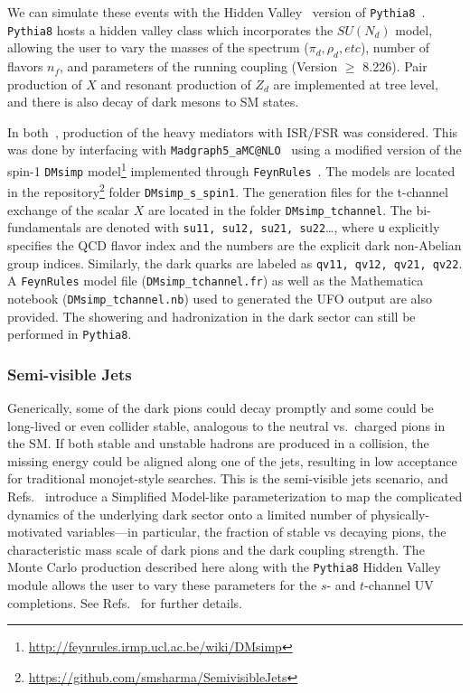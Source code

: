 
We can simulate these events with the Hidden Valley~\cite{Carloni:2010tw} version of \verb!Pythia8!~\cite{Sjostrand:2014zea}. \verb!Pythia8! hosts a hidden valley class which incorporates the $SU(N_{d})$ model, allowing the user to vary the masses of the spectrum ($\pi_{d}, \rho_{d}, etc$), number of flavors $n_{f}$, and parameters of the running coupling (Version $\geq$ 8.226). Pair production of $X$ and resonant production of $Z_d$ are implemented at tree level, and there is also decay of dark mesons to SM states.

In both~\cite{Cohen:2017pzm,Linthorne:2018abc}, production of the heavy mediators with ISR/FSR was considered. This was done by interfacing with \verb!Madgraph5_aMC@NLO!~\cite{Alwall:2014hca} using a modified version of the spin-1 \texttt{DMsimp} model\footnote{\url{http://feynrules.irmp.ucl.ac.be/wiki/DMsimp}} implemented through \texttt{FeynRules}~\cite{Alloul:2013bka}.
The models are located in the repository\footnote{\url{https://github.com/smsharma/SemivisibleJets}} folder \texttt{DMsimp\_s\_spin1}.  The generation files for the t-channel exchange of the scalar $X$  are located in the folder \texttt{DMsimp\_tchannel}. The bi-fundamentals are denoted with \texttt{su11, su12, su21, su22}\ldots, where \texttt{u} explicitly specifies the QCD flavor index and the numbers are the explicit dark non-Abelian group indices. Similarly, the dark quarks are labeled as \texttt{qv11, qv12, qv21, qv22}. A \texttt{FeynRules} model file (\texttt{DMsimp\_tchannel.fr}) as well as the Mathematica notebook (\texttt{DMsimp\_tchannel.nb}) used to generated the UFO output are also provided. The showering and hadronization in the dark sector can still be performed in \verb!Pythia8!. 


\subsubsection{Semi-visible Jets}

Generically, some of the dark pions could decay promptly and some could be long-lived or even collider stable, analogous to the neutral vs.~charged pions in the SM. If both stable and unstable hadrons are produced in a collision, the missing energy could be aligned along one of the jets, resulting in low acceptance for traditional monojet-style searches. This is the semi-visible jets scenario, and Refs.~\cite{Cohen:2015toa,Cohen:2017pzm} introduce a Simplified Model-like parameterization to map the complicated dynamics of the underlying dark sector onto a limited number of physically-motivated variables---in particular, the fraction of stable vs decaying pions, the characteristic mass scale of dark pions and the dark coupling strength. The Monte Carlo production described here along with the \texttt{Pythia8} Hidden Valley module allows the user to vary these parameters for the $s$- and $t$-channel UV completions. See Refs.~\cite{Cohen:2015toa,Cohen:2017pzm} for further details.

